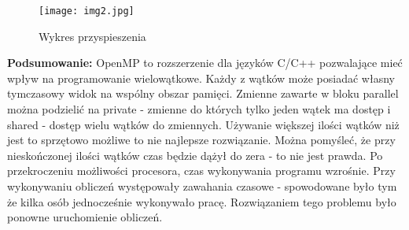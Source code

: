 \documentclass[a4paper,12pt]{article}
\begin{document}
\begin{wrapfigure}{r}{0.5\textwidth}
	\vspace{-40pt}
	\begin{center}
		\texttt{[image: img2.jpg]}
	\end{center}
	\vspace{-20pt}
	\caption{Wykres przyspieszenia}
	\vspace{35pt}
\end{wrapfigure}


\textbf{Podsumowanie:} OpenMP to rozszerzenie dla języków C/C++ pozwalające mieć wpływ na programowanie wielowątkowe. Każdy z wątków może posiadać własny tymczasowy widok na wspólny obszar pamięci. Zmienne zawarte w bloku parallel można podzielić na private - zmienne do których tylko jeden wątek ma dostęp i shared - dostęp wielu wątków do zmiennych. Używanie większej ilości wątków niż jest to sprzętowo możliwe to nie najlepsze rozwiązanie. Można pomyśleć, że przy nieskończonej ilości wątków czas będzie dążył do zera - to nie jest prawda. Po przekroczeniu możliwości procesora, czas wykonywania programu wzrośnie. Przy wykonywaniu obliczeń występowały zawahania czasowe - spowodowane było tym że kilka osób jednocześnie wykonywało pracę. Rozwiązaniem tego problemu było ponowne uruchomienie obliczeń.
\end{document}
